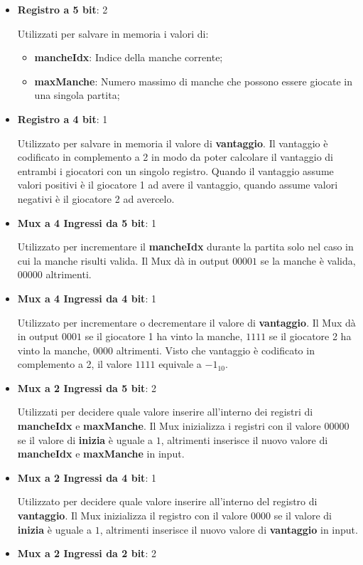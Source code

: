 \documentclass[a4paper]{article}
\begin{document}
\begin{itemize}
	\item \textbf{Registro a 5 bit}: 2

	      \noindent Utilizzati per salvare in memoria i valori di:
	      \begin{itemize}
		      \item \textbf{mancheIdx}: Indice della manche corrente;
		      \item \textbf{maxManche}: Numero massimo di manche che possono essere giocate in una singola partita;
	      \end{itemize}
	\item \textbf{Registro a 4 bit}: 1

	      \noindent Utilizzato per salvare in memoria il valore di \textbf{vantaggio}. Il vantaggio è codificato in complemento
	      a 2 in modo da poter calcolare il vantaggio di entrambi i giocatori con un singolo registro. Quando il
	      vantaggio assume valori positivi è il giocatore 1 ad avere il vantaggio, quando assume valori negativi
	      è il giocatore 2 ad avercelo.
	\item \textbf{Mux a 4 Ingressi da 5 bit}: 1

	      \noindent Utilizzato per incrementare il \textbf{mancheIdx} durante la partita solo nel caso in cui la manche
	      risulti valida. Il Mux dà in output \( 00001 \) se la manche è valida, \( 00000 \) altrimenti.
	\item \textbf{Mux a 4 Ingressi da 4 bit}: 1

	      \noindent Utilizzato per incrementare o decrementare il valore di \textbf{vantaggio}. Il Mux dà in output
	      \( 0001 \) se il giocatore 1 ha vinto la manche, \( 1111 \) se il giocatore 2 ha vinto la manche,
	      \( 0000 \) altrimenti. Visto che vantaggio è codificato in complemento a 2, il valore \( 1111 \) equivale
	      a \( -1_{10} \).
	\item \textbf{Mux a 2 Ingressi da 5 bit}: 2

	      \noindent Utilizzati per decidere quale valore inserire all'interno dei registri di \textbf{mancheIdx}
	      e \textbf{maxManche}. Il Mux inizializza i registri con il valore \( 00000 \) se il valore di \textbf{inizia}
	      è uguale a \( 1 \), altrimenti inserisce il nuovo valore di \textbf{mancheIdx} e \textbf{maxManche} in input.
	\item \textbf{Mux a 2 Ingressi da 4 bit}: 1

	      \noindent Utilizzato per decidere quale valore inserire all'interno del registro di \textbf{vantaggio}.
	      Il Mux inizializza il registro con il valore \( 0000 \) se il valore di \textbf{inizia} è uguale a \( 1 \),
	      altrimenti inserisce il nuovo valore di \textbf{vantaggio} in input.
	\item \textbf{Mux a 2 Ingressi da 2 bit}: 2


\end{itemize}
\end{document}
